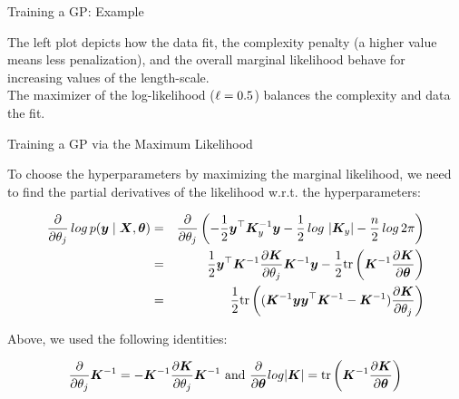\begin{frame}[c,allowframebreaks]{Training a GP: Example}
\begin{footnotesize}
\textcolor{blue}{\faInfoCircle} The left plot depicts how the data fit, the complexity penalty (a higher value means less penalization), and the overall marginal likelihood behave for increasing values of the length-scale.\\
\vspace{3mm}
\textcolor{blue}{\faLightbulbO} The maximizer of the log-likelihood ($\ell = 0.5$) balances the complexity and data the fit.
\end{footnotesize}


\end{frame}

\begin{frame}[c,allowframebreaks]{Training a GP via the Maximum Likelihood}

To choose the hyperparameters by maximizing the marginal likelihood, we need to find the partial derivatives of the likelihood w.r.t. the hyperparameters:

\begin{footnotesize}
\begin{eqnarray*}
\frac{\partial}{\partial\theta_j} \, log\,p(\bm{y} \mid \bm{X}, \bm{\theta}) &=& \frac{\partial}{\partial\theta_j}  \left(-\frac{1}{2}\bm{y}^\top\bm{K}_y^{-1} \bm{y} - \frac{1}{2}\,log\, \left| \bm{K}_y \right| - \frac{n}{2} \,log\, 2\pi\right) \\ 
&=&\frac{1}{2} \bm{y}^\top \bm{K}^{-1} \frac{\partial \bm{K}}{\partial \theta_j}\bm{K}^{-1} \bm{y} - \frac{1}{2} \text{tr}\left(\bm{K}^{-1} \frac{\partial \bm{K}}{\partial \bm{\theta}} \right) \\
&=& \frac{1}{2} \text{tr}\left((\bm{K}^{-1}\bm{y}\bm{y}^\top\bm{K}^{-1} - \bm{K}^{-1})\frac{\partial\bm{K}}{\partial\theta_j}\right)
\end{eqnarray*}
\end{footnotesize}

\textcolor{blue}{\faLightbulbO} Above, we used the following identities:
\begin{footnotesize}
$$\frac{\partial}{\partial \theta_j} \bm{K}^{-1} = - \bm{K}^{-1} \frac{\partial \bm{K}}{\partial \theta_j}\bm{K}^{-1}\text{ and } \frac{\partial}{\partial \bm{\theta}} log  |\bm{K}| = \text{tr}\left(\bm{K}^{-1} \frac{\partial \bm{K}}{\partial \bm{\theta}} \right)$$
\end{footnotesize}
\framebreak



\end{frame}
